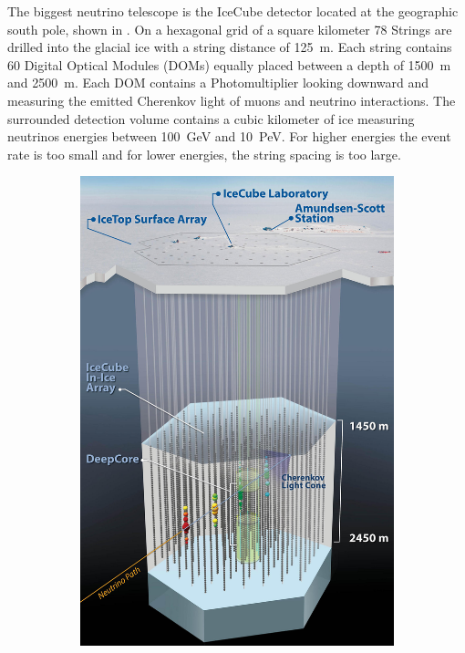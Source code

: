 The biggest neutrino telescope is the IceCube detector located at the geographic south pole, shown in .
On a hexagonal grid of a square kilometer 78 Strings are drilled into the glacial ice with a string distance of \SI{125}{m}.
Each string contains 60 Digital Optical Modules (DOMs) equally placed between a depth of \SI{1500}{m} and \SI{2500}{m}.
Each DOM contains a Photomultiplier looking downward and measuring the emitted Cherenkov light of muons and neutrino interactions.
The surrounded detection volume contains a cubic kilometer of ice measuring neutrinos energies between \SI{100}{GeV} and \SI{10}{PeV}.
For higher energies the event rate is too small and for lower energies, the string spacing is too large.
\begin{figure}
    \centering
    \begin{subfigure}[t]{0.58\textwidth}
        \centering
        \includegraphics[width=\textwidth]{./images/icecube_detector.jpg}

\end{subfigure}
\end{figure}
